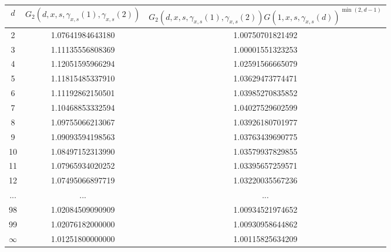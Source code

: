 \documentclass[12pt,a4paper]{amsart}
\numberwithin{equation}{section}
\theoremstyle{plain}
\theoremstyle{definition}
\newcommand{\1}{\textbf{1}}
\begin{document}
\begin{table}[!h]
\begin{center}
\begin{tabular}{|c|c|c|} \hline
$d$ & $G_2(d,x,s,\gamma_{x,s}(1),\gamma_{x,s}(2))$ & $G_2(d,x,s,\gamma_{x,s}(1),\gamma_{x,s}(2))G(1,x,s,\gamma_{x,s}(d))^{\min(2,d-1)}$ \\ \hline
2 & 1.07641984643180 & 1.00750701821492  \\ \hline
3 & 1.11135556808369 & 1.00001551323253  \\ \hline
4 &1.12051595966294 &1.02591566665079   \\ \hline
5 &1.11815485337910 &1.03629473774471   \\ \hline
6 &1.11192862150501 &1.03985270835852    \\ \hline
7 &1.10468853332594 &1.04027529602599    \\ \hline
8 &1.09755066213067 &1.03926180701977    \\ \hline
9 &1.09093594198563 &1.03763439690775    \\ \hline
10 &1.08497152313990 &1.03579937829855   \\ \hline
11 &1.07965934020252 &1.03395657259571   \\ \hline
12 &1.07495066897719 &1.03220035567236   \\ \hline
... &  ... &  ... \\ \hline
98 &1.02084509090909 &1.00934521974652  \\ \hline
99 &1.02076182000000 &1.00930958644862  \\ \hline
$\infty$ &1.01251800000000 &1.00115825634209  \\ \hline
\end{tabular}
\caption{}
\end{center}
\end{table}
\end{document}

